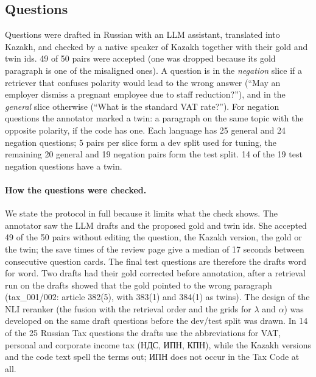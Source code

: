 \documentclass[11pt]{article}
\newcommand{\ru}[1]{#1}
\begin{document}
\subsection{Questions}
Questions were drafted in Russian with an LLM assistant, translated into Kazakh, and checked by a native
speaker of Kazakh together with their gold and twin ids. 49 of 50 pairs were accepted (one was dropped
because its gold paragraph is one of the misaligned ones). A question is in the \emph{negation} slice if a
retriever that confuses polarity would lead to the wrong answer (``May an employer dismiss a pregnant
employee due to staff reduction?''), and in the \emph{general} slice otherwise (``What is the standard VAT
rate?''). For negation questions the annotator marked a twin: a paragraph on the same topic with the
opposite polarity, if the code has one. Each language has 25 general and 24 negation questions; 5 pairs per
slice form a dev split used for tuning, the remaining 20 general and 19 negation pairs form the test split.
14 of the 19 test negation questions have a twin.

\paragraph{How the questions were checked.} We state the protocol in full because it limits what the
check shows. The annotator saw the LLM drafts and the proposed gold and twin ids. She accepted 49 of the 50
pairs without editing the question, the Kazakh version, the gold or the twin; the save times of the review
page give a median of 17 seconds between consecutive question cards. The final test questions are therefore
the drafts word for word. Two drafts had their gold corrected before annotation, after a retrieval run on the
drafts showed that the gold pointed to the wrong paragraph (tax\_001/002: article 382(5), with 383(1) and
384(1) as twins). The design of the NLI reranker (the fusion with the retrieval order and the grids for
$\lambda$ and $\alpha$) was developed on the same draft questions before the dev/test split was drawn. In 14
of the 25 Russian Tax questions the drafts use the abbreviations for VAT, personal and corporate income tax
(\ru{НДС, ИПН, КПН}), while the Kazakh versions and the code text spell the terms out; \ru{ИПН} does not occur in
the Tax Code at all.
\end{document}
